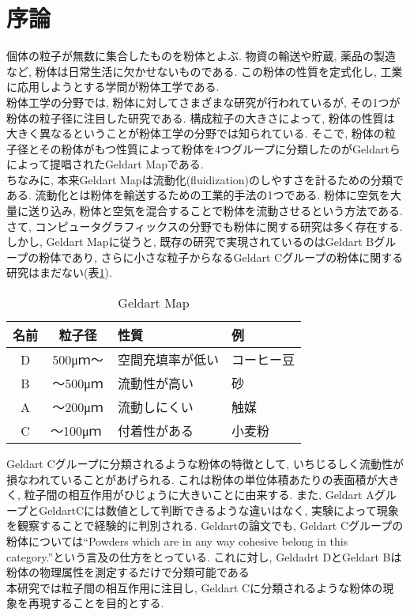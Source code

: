  \section{序論}
 個体の粒子が無数に集合したものを粉体とよぶ.
 物資の輸送や貯蔵, 薬品の製造など, 粉体は日常生活に欠かせないものである.
 この粉体の性質を定式化し, 工業に応用しようとする学問が粉体工学である.\\
 粉体工学の分野では, 粉体に対してさまざまな研究が行われているが, その1つが粉体の粒子径に注目した研究である.
 構成粒子の大きさによって, 粉体の性質は大きく異なるということが粉体工学の分野では知られている.
 そこで, 粉体の粒子径とその粉体がもつ性質によって粉体を4つグループに分類したのがGeldartらによって提唱されたGeldart Map\cite{geldart_map}である.\\
 ちなみに, 本来Geldart Mapは流動化(fluidization)のしやすさを計るための分類である.
 流動化とは粉体を輸送するための工業的手法の1つである.
 粉体に空気を大量に送り込み, 粉体と空気を混合することで粉体を流動させるという方法である.\\
 さて, コンピュータグラフィックスの分野でも粉体に関する研究は多く存在する.
 しかし, Geldart Mapに従うと, 既存の研究で実現されているのはGeldart Bグループの粉体であり, 
 さらに小さな粒子からなるGeldart Cグループの粉体に関する研究はまだない(表\ref{tab:geldart_map}).\\
 
  \begin{table}[h]
   \begin{center}  
    \caption{Geldart Map}
    \begin{tabular}{|c|c|l|l|} \hline
     名前 & 粒子径   &  性質              & 例 \\ \hline
     D & 500μｍ〜 &   空間充填率が低い        & コーヒー豆 \\
     B & 〜500μｍ & 流動性が高い        & 砂 \\
     A & 〜200μｍ & 流動しにくい   & 触媒 \\ 
     C & 〜100μｍ & 付着性がある         & 小麦粉 \\
     \hline
    \end{tabular}
    \label{tab:geldart_map}
   \end{center}
  \end{table}
  
 Geldart Cグループに分類されるような粉体の特徴として, いちじるしく流動性が損なわれていることがあげられる.
 これは粉体の単位体積あたりの表面積が大きく, 粒子間の相互作用がひじょうに大きいことに由来する.
 また, Geldart AグループとGeldartCには数値として判断できるような違いはなく, 実験によって現象を観察することで経験的に判別される.
Geldartの論文でも, Geldart Cグループの粉体については``Powders which are in any way cohesive belong in this category.''という言及の仕方をとっている.
 これに対し, Geldadrt DとGeldart Bは粉体の物理属性を測定するだけで分類可能である\\
 本研究では粒子間の相互作用に注目し, Geldart Cに分類されるような粉体の現象を再現することを目的とする.
 
